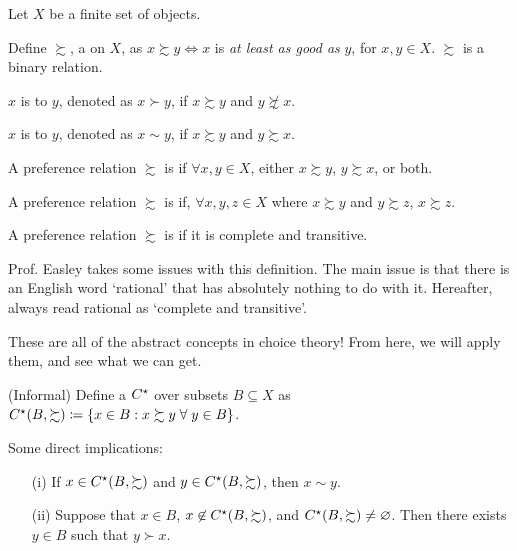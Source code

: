 \documentclass[12pt]{article}
\begin{document}
\begin{assumption}
	Let $X$ be a finite set of objects. 
\end{assumption}

\begin{definition}
	Define $\succsim$, a  on $X$, as $x \succsim y \Longleftrightarrow x$ is \emph{at least as good as} $y$, for $x,y \in X$. $\succsim$ is a binary relation.
\end{definition}

\begin{definition}
	$x$ is  to $y$, denoted as $x \succ y$, if $x \succsim y$ and $y \not\succsim x$.
\end{definition}
\begin{definition}
	$x$ is  to $y$, denoted as $x \sim y$, if $x \succsim y$ and $y \succsim x$.
\end{definition}

\begin{definition}
	A preference relation $\succsim$ is  if $\forall x,y \in X$, either $x\succsim y$, $y \succsim x$, or both.
\end{definition}
\begin{definition}
	A preference relation $\succsim$ is  if, $\forall x,y,z \in X$ where $x \succsim y$ and $y \succsim z$, $x \succsim z$.
\end{definition}
\begin{definition}
	A preference relation $\succsim$ is  if it is complete and transitive.
\end{definition}
\begin{remark}
	Prof. Easley takes some issues with this definition. The main issue is that there is an English word `rational' that has absolutely nothing to do with it. Hereafter, always read rational as `complete and transitive'.
\end{remark}

\begin{remark}
	These are all of the abstract concepts in choice theory! From here, we will apply them, and see what we can get. 
\end{remark}

\begin{definition}
	(Informal) Define a  $C^\star$ over subsets $B \subseteq X$ as $C\opt(B,\succsim) \coloneqq \{x \in B : x \succsim y \forall y \in B\}$.
\end{definition}
\begin{remark}
	Some direct implications:
	\begin{itemize}
		\item[(i)] If $x \in C^\star(B,\succsim)$ and $y \in C^\star(B,\succsim)$, then $x \sim y$.
		
		\item[(ii)] Suppose that $x \in B$, $x \not\in C^\star(B,\succsim)$, and $C^\star(B,\succsim) \ne \mathop{\varnothing}$. Then there exists $y \in B$ such that $y \succ x$. 
	\end{itemize}
\end{remark}
\end{document}
